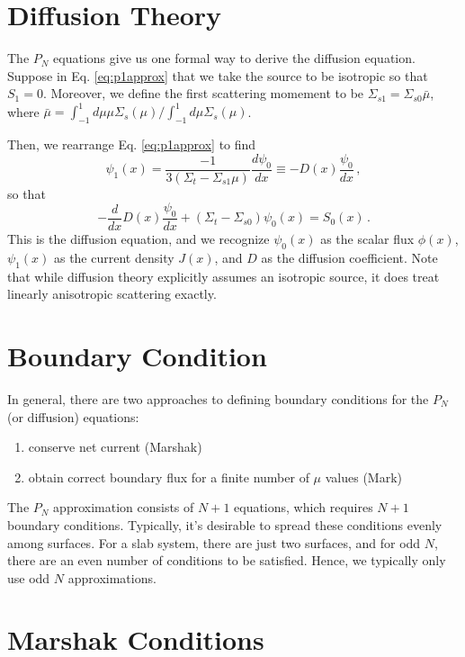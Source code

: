 \section*{Diffusion Theory}

The $P_N$ equations give us one formal way to derive the diffusion equation.  Suppose in Eq. \ref{eq:p1approx} that we take the source to be isotropic so that $S_1 = 0$.  Moreover, we define the first scattering momement to be $\Sigma_{s1} = \Sigma_{s0}\bar{\mu}$, where $\bar{\mu} = \int^1_{-1}d\mu \mu \Sigma_s(\mu) / \int^1_{-1} d\mu \Sigma_s(\mu)$.

Then, we rearrange Eq. \ref{eq:p1approx} to find
\begin{equation}
 \psi_1 (x) = \frac{-1}{3(\Sigma_t - \Sigma_{s1}\mu)} \frac{d\psi_0}{dx} \equiv -D(x) \frac{\psi_0}{dx} \, ,
\end{equation}
so that 
\begin{equation}
 -\frac{d}{dx} D(x) \frac{\psi_0}{dx} + (\Sigma_t - \Sigma_{s0})\psi_0(x) = S_0 (x) \, .
\label{eq:neutrondiffusion}
\end{equation}
This is the diffusion equation, and we recognize $\psi_0(x)$ as the scalar flux $\phi(x)$, $\psi_1(x)$ as the current density $J(x)$, and $D$ as the diffusion coefficient.  Note that while diffusion theory explicitly assumes an isotropic source, it does treat linearly anisotropic scattering exactly.

\section*{Boundary Condition}

In general, there are two approaches to defining boundary conditions for the $P_N$ (or diffusion) equations:
\begin{enumerate}
 \item conserve net current (Marshak)
 \item obtain correct boundary flux for a finite number of $\mu$ values (Mark)
\end{enumerate}
The $P_N$ approximation consists of $N+1$ equations, which requires $N+1$ boundary conditions.  Typically, it's desirable to spread these conditions evenly among surfaces.  For a slab system, there are just two surfaces, and for odd $N$, there are an even number of conditions to be satisfied.  Hence, we typically only use odd $N$ approximations.

\section*{Marshak Conditions}

